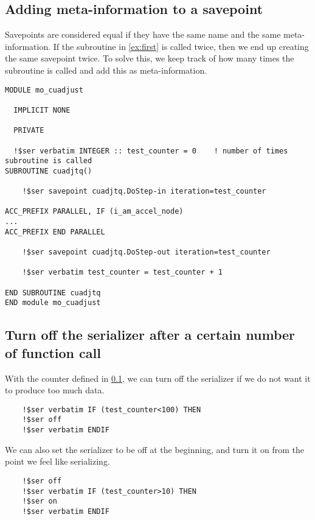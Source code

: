 \documentclass{article}
\begin{document}
\subsection{Adding meta-information to a savepoint}
\label{ex:metainfo}
Savepoints are considered equal if they have the same name and the same meta-information. If the subroutine in \ref{ex:first} is called twice, then we end up creating the same savepoint twice. To solve this, we keep track of how many times the subroutine is called and add this as meta-information.

\begin{lstlisting}
MODULE mo_cuadjust

  IMPLICIT NONE

  PRIVATE

  !$ser verbatim INTEGER :: test_counter = 0    ! number of times subroutine is called
SUBROUTINE cuadjtq()

    !$ser savepoint cuadjtq.DoStep-in iteration=test_counter

ACC_PREFIX PARALLEL, IF (i_am_accel_node)
...
ACC_PREFIX END PARALLEL

    !$ser savepoint cuadjtq.DoStep-out iteration=test_counter

    !$ser verbatim test_counter = test_counter + 1

END SUBROUTINE cuadjtq
END module mo_cuadjust
\end{lstlisting}

\subsection{Turn off the serializer after a certain number of function call}
With the counter defined in \ref{ex:metainfo}, we can turn off the serializer if we do not want it to produce too much data.
\begin{lstlisting}
    !$ser verbatim IF (test_counter<100) THEN
    !$ser off
    !$ser verbatim ENDIF
\end{lstlisting}

We can also set the serializer to be off at the beginning, and turn it on from the point we feel like serializing.
\begin{lstlisting}
    !$ser off
    !$ser verbatim IF (test_counter>10) THEN
    !$ser on
    !$ser verbatim ENDIF
\end{lstlisting}
\end{document}
